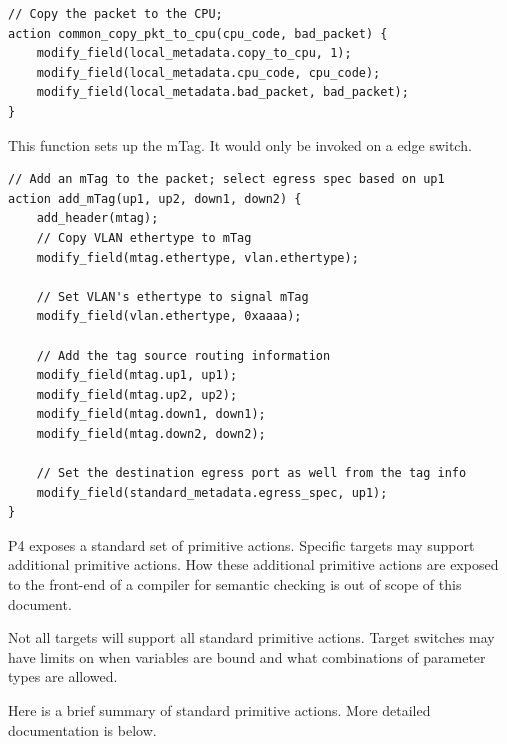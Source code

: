\documentclass[12pt]{article}
\begin{document}
\begin{lstlisting}[keywords={},frame=single,escapechar=\@]
// Copy the packet to the CPU;
action common_copy_pkt_to_cpu(cpu_code, bad_packet) {
    modify_field(local_metadata.copy_to_cpu, 1);
    modify_field(local_metadata.cpu_code, cpu_code);
    modify_field(local_metadata.bad_packet, bad_packet);
}
\end{lstlisting}


This function sets up the mTag. It would only be invoked on a edge switch.

\begin{lstlisting}[keywords={},frame=single,escapechar=\@]
// Add an mTag to the packet; select egress spec based on up1
action add_mTag(up1, up2, down1, down2) {
    add_header(mtag);
    // Copy VLAN ethertype to mTag
    modify_field(mtag.ethertype, vlan.ethertype);

    // Set VLAN's ethertype to signal mTag
    modify_field(vlan.ethertype, 0xaaaa);

    // Add the tag source routing information
    modify_field(mtag.up1, up1);
    modify_field(mtag.up2, up2);
    modify_field(mtag.down1, down1);
    modify_field(mtag.down2, down2);

    // Set the destination egress port as well from the tag info
    modify_field(standard_metadata.egress_spec, up1);
}
\end{lstlisting}



P4 exposes a standard set of primitive actions. Specific targets may support
additional primitive actions. How these additional primitive actions are exposed
to the front-end of a compiler for semantic checking is out of scope of this
document.

Not all targets will support all standard primitive actions. Target switches may
have limits on when variables are bound and what combinations of parameter types
are allowed.

Here is a brief summary of standard primitive actions. More detailed
documentation is below.
\end{document}
